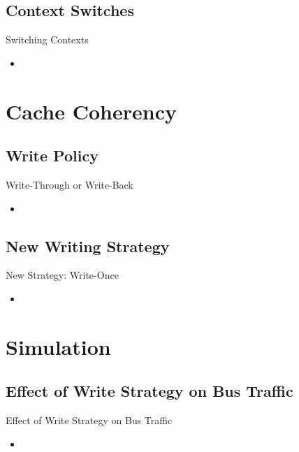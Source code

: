 \documentclass{beamer}
\begin{document}
\subsection{Context Switches}

\begin{frame}{Switching Contexts}
	\begin{itemize}
		\item {
			}
	\end{itemize}
\end{frame}

\section{Cache Coherency}

\subsection{Write Policy}
\begin{frame}{Write-Through or Write-Back}
	\begin{itemize}
		\item {
			
		}
	\end{itemize}
\end{frame}

\subsection{New Writing Strategy}

\begin{frame}{New Strategy: Write-Once}
	\begin{itemize}
		\item {
			}
	\end{itemize}
\end{frame}

\section{Simulation}
\subsection{Effect of Write Strategy on Bus Traffic}
\begin{frame}{Effect of Write Strategy on Bus Traffic}
	\begin{itemize}
		\item {
			}
	\end{itemize}
\end{frame}
\end{document}
